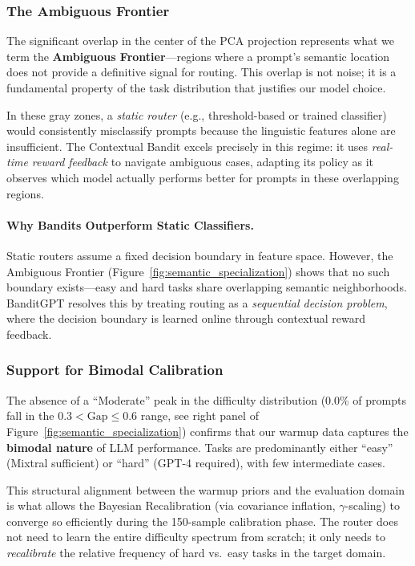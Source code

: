 \subsubsection{The Ambiguous Frontier}

The significant overlap in the center of the PCA projection represents what we term the \textbf{Ambiguous Frontier}---regions where a prompt's semantic location does not provide a definitive signal for routing.
This overlap is not noise; it is a fundamental property of the task distribution that justifies our model choice.

In these gray zones, a \emph{static router} (e.g., threshold-based or trained classifier) would consistently misclassify prompts because the linguistic features alone are insufficient.
The Contextual Bandit excels precisely in this regime: it uses \emph{real-time reward feedback} to navigate ambiguous cases, adapting its policy as it observes which model actually performs better for prompts in these overlapping regions.

\paragraph{Why Bandits Outperform Static Classifiers.}
Static routers assume a fixed decision boundary in feature space.
However, the Ambiguous Frontier (Figure~\ref{fig:semantic_specialization}) shows that no such boundary exists---easy and hard tasks share overlapping semantic neighborhoods.
BanditGPT resolves this by treating routing as a \emph{sequential decision problem}, where the decision boundary is learned online through contextual reward feedback.

\subsubsection{Support for Bimodal Calibration}

The absence of a ``Moderate'' peak in the difficulty distribution (0.0\% of prompts fall in the $0.3 < \text{Gap} \le 0.6$ range, see right panel of Figure~\ref{fig:semantic_specialization}) confirms that our warmup data captures the \textbf{bimodal nature} of LLM performance.
Tasks are predominantly either ``easy'' (Mixtral sufficient) or ``hard'' (GPT-4 required), with few intermediate cases.

This structural alignment between the warmup priors and the evaluation domain is what allows the Bayesian Recalibration (via covariance inflation, $\gamma$-scaling) to converge so efficiently during the 150-sample calibration phase.
The router does not need to learn the entire difficulty spectrum from scratch; it only needs to \emph{recalibrate} the relative frequency of hard vs.\ easy tasks in the target domain.

